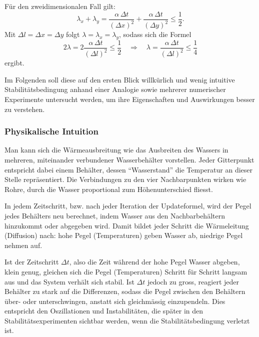 Für den zweidimensionalen Fall gilt:
\begin{equation}
	\lambda_x + \lambda_y =
	\frac{\alpha \, \Delta t}{(\Delta x)^2} +
	\frac{\alpha \, \Delta t}{(\Delta y)^2} \leq \frac{1}{2}.
\end{equation}
Mit \(\Delta l = \Delta x = \Delta y\) folgt \(\lambda = \lambda_x = \lambda_y\), sodass sich die Formel
\begin{equation}
	\label{parallelisierung:eq:stabForExp}
	2\lambda = 2 \frac{\alpha \, \Delta t}{(\Delta l)^2} \leq \frac{1}{2}
	\quad \Rightarrow \quad
	\lambda = \frac{\alpha \, \Delta t}{(\Delta l)^2} \leq \frac{1}{4}
\end{equation}
ergibt.

Im Folgenden soll diese auf den ersten Blick willkürlich und wenig intuitive Stabilitätsbedingung anhand einer Analogie sowie mehrerer numerischer Experimente untersucht werden, um ihre Eigenschaften und Auswirkungen besser zu verstehen.

\subsubsection{Physikalische Intuition}  
Man kann sich die Wärmeausbreitung wie das Ausbreiten des Wassers in mehreren, miteinander verbundener Wasserbehälter vorstellen.
Jeder Gitterpunkt entspricht dabei einem Behälter, dessen ``Wasserstand'' die Temperatur an dieser Stelle repräsentiert.
Die Verbindungen zu den vier Nachbarpunkten wirken wie Rohre, durch die Wasser proportional zum Höhenunterschied fliesst.

In jedem Zeitschritt, bzw. nach jeder Iteration der Updateformel, wird der Pegel jedes Behälters neu berechnet, indem Wasser aus den Nachbarbehältern hinzukommt oder abgegeben wird.
Damit bildet jeder Schritt die Wärmeleitung (Diffusion) nach: hohe Pegel (Temperaturen) geben Wasser ab, niedrige Pegel nehmen auf.
%
%

Ist der Zeitschritt  \(\Delta t\), also die Zeit während der hohe Pegel Wasser abgeben, klein genug, gleichen sich die Pegel (Temperaturen) Schritt für Schritt langsam aus und das System verhält sich stabil.
Ist \(\Delta t\) jedoch zu gross, reagiert jeder Behälter zu stark auf die Differenzen, sodass die Pegel zwischen den Behältern über- oder unterschwingen, anstatt sich gleichmässig einzupendeln.
Dies entspricht den Oszillationen und Instabilitäten, die später in den Stabilitätsexperimenten sichtbar werden, wenn die Stabilitätsbedingung verletzt ist.
%
%

